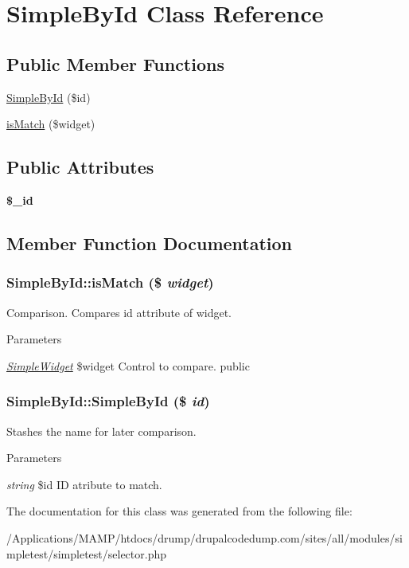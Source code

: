 \hypertarget{class_simple_by_id}{
\section{SimpleById Class Reference}
\label{class_simple_by_id}
}
\subsection*{Public Member Functions}
\begin{DoxyCompactItemize}
\item 
\hyperlink{class_simple_by_id_a46cda17dd142c3627b9faef1ca5b1534}{SimpleById} (\$id)
\item 
\hyperlink{class_simple_by_id_a1a109f5c1be49a1750f584afca647742}{isMatch} (\$widget)
\end{DoxyCompactItemize}
\subsection*{Public Attributes}
\begin{DoxyCompactItemize}
\item 
\hypertarget{class_simple_by_id_a1189b23086cc15f8351d20dc1ac59d47}{
{\bfseries \$\_\-id}}
\label{class_simple_by_id_a1189b23086cc15f8351d20dc1ac59d47}

\end{DoxyCompactItemize}


\subsection{Member Function Documentation}
\hypertarget{class_simple_by_id_a1a109f5c1be49a1750f584afca647742}{
\subsubsection[{isMatch}]{\setlength{\rightskip}{0pt plus 5cm}SimpleById::isMatch (\$ {\em widget})}}
\label{class_simple_by_id_a1a109f5c1be49a1750f584afca647742}
Comparison. Compares id attribute of widget. 
\begin{DoxyParams}{Parameters}
\item[{\em \hyperlink{class_simple_widget}{SimpleWidget}}]\$widget Control to compare.  public \end{DoxyParams}
\hypertarget{class_simple_by_id_a46cda17dd142c3627b9faef1ca5b1534}{
\subsubsection[{SimpleById}]{\setlength{\rightskip}{0pt plus 5cm}SimpleById::SimpleById (\$ {\em id})}}
\label{class_simple_by_id_a46cda17dd142c3627b9faef1ca5b1534}
Stashes the name for later comparison. 
\begin{DoxyParams}{Parameters}
\item[{\em string}]\$id ID atribute to match. \end{DoxyParams}


The documentation for this class was generated from the following file:\begin{DoxyCompactItemize}
\item 
/Applications/MAMP/htdocs/drump/drupalcodedump.com/sites/all/modules/simpletest/simpletest/selector.php\end{DoxyCompactItemize}
